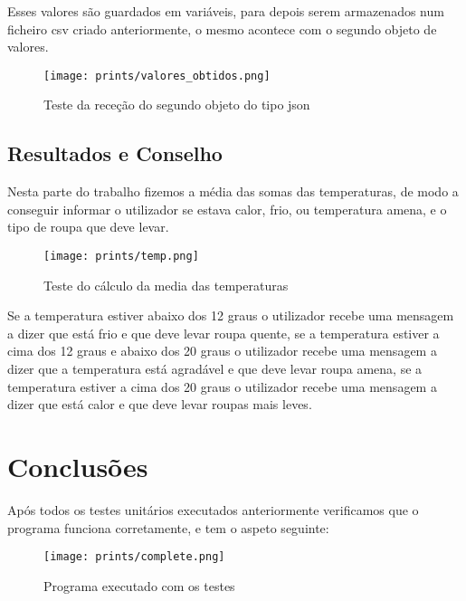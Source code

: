 \documentclass[a4paper]{report}
\begin{document}
Esses valores são guardados em variáveis, para depois serem armazenados num ficheiro \ac{csv} criado anteriormente, o mesmo acontece com o segundo objeto de valores.

\begin{center}
\begin{figure}[H]
\center
\texttt{[image: prints/valores\_obtidos.png]}
\caption{Teste da receção do segundo objeto do tipo \ac{json}}
\end{figure}
\end{center}

\section{Resultados e Conselho}

Nesta parte do trabalho fizemos a média das somas das temperaturas, de modo a conseguir informar o utilizador se estava calor, frio, ou temperatura amena, e o tipo de roupa que deve levar.

\begin{center}
\begin{figure}[H]
\center
\texttt{[image: prints/temp.png]}
\caption{Teste do cálculo da media das temperaturas}
\end{figure}
\end{center}

Se a temperatura estiver abaixo dos 12 graus o utilizador recebe uma mensagem a dizer que está frio e que deve levar roupa quente, se a temperatura estiver a cima dos 12 graus e abaixo dos 20 graus o utilizador recebe uma mensagem a dizer que a temperatura está agradável e que deve levar roupa amena, se a temperatura estiver a cima dos 20 graus o utilizador recebe uma mensagem a dizer que está calor e que deve levar roupas mais leves.

\chapter{Conclusões}
\label{chap.conclusao}

Após todos os testes unitários executados anteriormente verificamos que o programa funciona corretamente, e tem o aspeto seguinte:

\begin{center}
\begin{figure}[H]
\center
\texttt{[image: prints/complete.png]}
\caption{Programa executado com os testes}
\end{figure}
\end{center}
\end{document}
